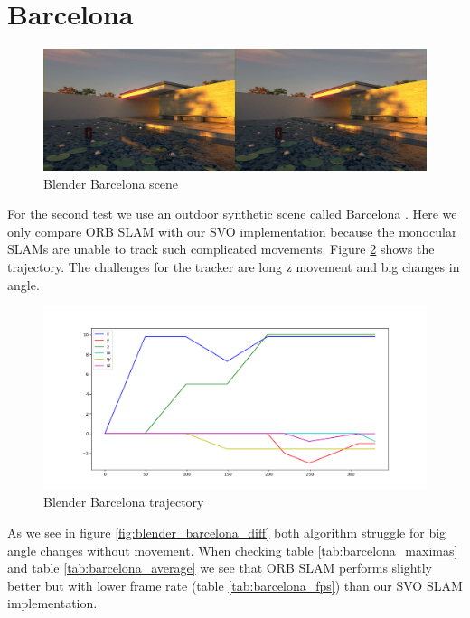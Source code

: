 \documentclass[11pt,a4paper,titlepage,oneside]{report}
\begin{document}
\section{Barcelona}

\begin{figure}[H]
  \includegraphics[width=1.0\textwidth]{img/blender_barcelona_scene.png}
  \caption{Blender Barcelona scene}\label{fig:blender_barcelona_scene}
\end{figure}

For the second test we use an outdoor synthetic scene called Barcelona \cite{blender}. Here we only compare ORB SLAM with our SVO implementation because the monocular SLAMs are unable to track such complicated movements. Figure \ref{fig:blender_barcelona_traj} shows the trajectory. The challenges for the tracker are long z movement and big changes in angle.

\begin{figure}[H]
  \includegraphics[width=1.0\textwidth]{img/blender_barcelona_traj.png}
  \caption{Blender Barcelona trajectory}\label{fig:blender_barcelona_traj}
\end{figure}

As we see in figure \ref{fig:blender_barcelona_diff} both algorithm struggle for big angle changes without movement. When checking table \ref{tab:barcelona_maximas} and table \ref{tab:barcelona_average} we see that ORB SLAM performs slightly better but with lower frame rate (table \ref{tab:barcelona_fps}) than our SVO SLAM implementation.
\end{document}
